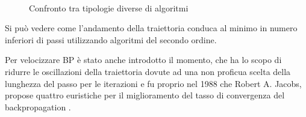 \begin{figure}[hbtb]
\centering
{} \quad
{} \\
\caption{Confronto tra tipologie diverse di algoritmi}
\label{discese}
\end{figure}
\vspace{5 mm}

Si può vedere come l'andamento della traiettoria conduca al minimo in numero inferiori di passi utilizzando algoritmi del secondo ordine.

Per velocizzare BP è stato anche introdotto il momento, che ha lo scopo di ridurre le oscillazioni della traiettoria dovute ad una non proficua scelta della lunghezza del passo per le iterazioni e fu proprio nel 1988 che Robert A. Jacobs, propose quattro euristiche per il miglioramento del tasso di convergenza del backpropagation \cite{nielsen_book}.

